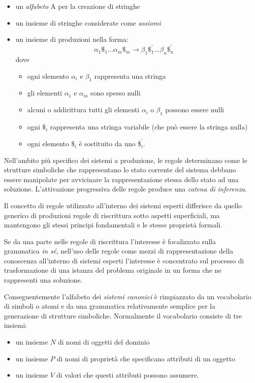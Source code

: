 \begin{itemize}
	\item un \emph{alfabeto} A per la creazione di stringhe
	\item un insieme di stringhe considerate come \emph{assiomi}
	\item un insieme di produzioni nella forma: 
	\[
	\alpha_1\$_1 \dots \alpha_m\$_m \rightarrow \beta_1\$_1^{'} \dots \beta_n\$_n^{'}
	\]	
	dove
	\begin{itemize}
		\item ogni elemento $\alpha_i$ e $\beta_1$ rappresenta una stringa
		\item gli elementi $\alpha_1$ e $\alpha_m$ sono spesso nulli
		\item alcuni o addirittura tutti gli elementi $\alpha_i$ o $\beta_1$ possono essere nulli
		\item ogni $\$_i$ rappresenta una stringa variabile (che può essere la stringa nulla)
		\item ogni elemento $\$_i$ è sostituito da uno $\$_i^{'}$.
	\end{itemize}
\end{itemize}

Nell'ambito più specifico dei sistemi a produzione, le regole determinano come le strutture simboliche che rappresentano lo stato corrente del sistema debbano essere manipolate per avvicinare la rappresentazione stessa dello stato ad una soluzione. L'attivazione progressiva delle regole produce una \emph{catena di inferenza}.

Il concetto di regole utilizzato all'interno dei sistemi esperti differisce da quello generico di produzioni regole di riscrittura sotto aspetti superficiali, ma mantengono gli stessi principi fondamentali e le stesse proprietà formali.

Se da una parte nelle regole di riscrittura l'interesse è focalizzato sulla grammatica \emph{in sé}, nell'uso delle regole come mezzi di rappresentazione della conoscenza all'interno di sistemi esperti l'interesse è concentrato sul processo di trasformazione di una istanza del problema originale in un forma che ne rappresenti una soluzione.

Conseguentemente l'alfabeto dei \emph{sistemi canonici} è rimpiazzato da un vocabolario di simboli o atomi e da una grammatica relativamente semplice per la generazione di strutture simboliche. Normalmente il vocabolario consiste di tre insiemi:

\begin{itemize}
	\item un insieme $N$ di nomi di oggetti del dominio
	\item un insieme $P$ di nomi di proprietà che specificano attributi di un oggetto
	\item un insieme $V$ di valori che questi attributi possono assumere.
\end{itemize}

